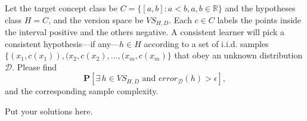 \documentclass[11pt,letter,notitlepage]{article}
\begin{document}
\begin{exercise} 
	Let the target concept class be $C=\{[a,b]:a<b, a,b\in\mathbb{R}\}$ and the hypotheses class $H=C$, and the version space be $VS_{H,D}$. Each $c\in C$ labels the points inside the interval positive and the others negative. A consistent learner will pick a consistent hypothesis---if any---$h\in H$ according to a set of i.i.d. samples $\{(x_1,c(x_1)),(x_2,c(x_2),\ldots,(x_m,c(x_m)\}$ that obey an unknown distribution $\mathcal{D}$. Please find 
	$$\mathbf{P}[\exists\, h\in VS_{H,D} \mbox{ and } error_{\mathcal{D}}(h)>\epsilon],$$
	and the corresponding sample complexity.
\end{exercise}


\begin{solution}
	Put your solutions here. 
\end{solution}
\end{document}

